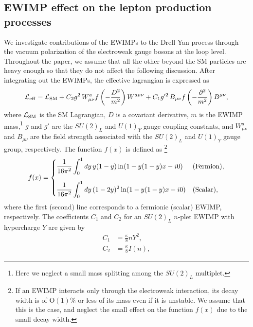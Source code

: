 \documentclass[12pt,twoside,book]{article}
\begin{document}
\subsection{EWIMP effect on the lepton production processes}
\label{sec:ewimp}

We investigate contributions of the EWIMPs to the Drell-Yan process
through the vacuum polarization of the electroweak gauge bosons at the
loop level. Throughout the paper, we assume that all the other beyond
the SM particles are heavy enough so that they do not affect the
following discussion.  After integrating out the EWIMPs, the effective
lagrangian is expressed as
\begin{align}
 \mathcal{L}_{\rm eff} = \mathcal{L}_{\rm SM} + C_2 g^2\, W_{\mu \nu}^a
 f\left(-\frac{D^2}{m^2}\right) W^{a\mu\nu} + C_1 g'^2\, B_{\mu\nu}
 f\left(-\frac{\partial^2}{m^2}\right) B^{\mu\nu},\label{eq_lag}
\end{align}
where $\mathcal{L}_{\rm SM}$ is the SM Lagrangian, $D$ is a covariant
derivative, $m$ is the EWIMP mass,\footnote{
Here we neglect a small mass splitting among the $SU(2)_L$ multiplet.
} $g$ and $g'$ are the
$SU(2)_L$ and $U(1)_Y$ gauge coupling constants, and $W_{\mu\nu}^a$
and $B_{\mu\nu}$ are the field strength associated with the $SU(2)_L$ and
$U(1)_Y$ gauge group, respectively.  The function $f(x)$ is defined as
\footnote{
  If an EWIMP interacts only through the electroweak interaction, its
  decay width is of $\mathrm{O}(1)\%$ or less of its mass even if it
  is unstable.  We assume that this is the case, and neglect the small
  effect on the function $f(x)$ due to the small decay width.
}
\begin{align}
 f(x) = \begin{cases}
	 \displaystyle{\frac{1}{16\pi^2} \int_0^1 dy\, y(1-y) \ln (1 -
	 y(1-y)x - i0)} & {\rm (Fermion)},\\[5mm]
	 \displaystyle{\frac{1}{16\pi^2} \int_0^1 dy\, (1-2y)^2 \ln (1-
	 y(1-y)x - i0)} & {\rm (Scalar)},
	\end{cases}\label{eq_f}
\end{align}
where the first (second) line corresponds to a fermionic (scalar) EWIMP, respectively.
The coefficients $C_1$ and $C_2$ for an $SU(2)_L$ $n$-plet EWIMP with hypercharge $Y$
are given by
\begin{align}
 C_1 &= \frac{\kappa}{8} n Y^2,\label{eq_C1}\\
 C_2 &= \frac{\kappa}{8} I(n),\label{eq_C2}
\end{align}
\end{document}
